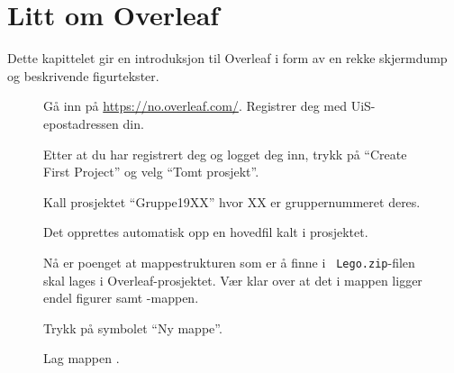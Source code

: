 
\chapter{Litt om Overleaf}\label{kap:overleaf}


Dette kapittelet gir en introduksjon til Overleaf i form av en rekke
skjermdump og beskrivende figurtekster.


\begin{figure}[H]
  \centering
  \caption{Gå inn på
    {\color{blue}\href{https://no.overleaf.com/}{https://no.overleaf.com/}}. Registrer
  deg med UiS-epostadressen din. } 
  \label{fig:bilde0}
\end{figure}

\begin{figure}[H]
  \centering
  \caption{Etter at du har registrert deg og logget deg inn, trykk på
    ``Create First Project'' og velg ``Tomt prosjekt''.}  
  \label{fig:bilde1}
\end{figure}

\begin{figure}[H]
  \centering
  \caption{Kall prosjektet ``Gruppe19XX'' hvor XX er
    gruppernummeret deres.} 
  \label{fig:bilde2}
\end{figure}

\begin{figure}[H]
  \centering
  \caption{Det opprettes automatisk opp en hovedfil kalt 
     i prosjektet.} 
  \label{fig:bilde2a}
\end{figure}

\begin{figure}[H]
  \centering
  \caption{Nå er poenget at mappestrukturen som er å finne i {\tt
      Lego.zip}-filen skal lages i Overleaf-prosjektet. Vær klar over
    at det i mappen  ligger endel figurer samt -mappen. } 
  \label{fig:bilde2b}
\end{figure}

\begin{figure}[H]
  \centering
  \caption{Trykk på symbolet ``Ny mappe''.} 
  \label{fig:bilde4}
\end{figure}

\begin{figure}[H]
  \centering
  \caption{Lag mappen .} 
  \label{fig:bilde5}
\end{figure}


